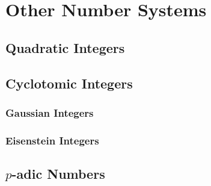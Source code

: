 \section{Other Number Systems}



\subsection{Quadratic Integers}




\subsection{Cyclotomic Integers}


\subsubsection{Gaussian Integers}

\subsubsection{Eisenstein Integers}




\subsection{$p$-adic Numbers}

